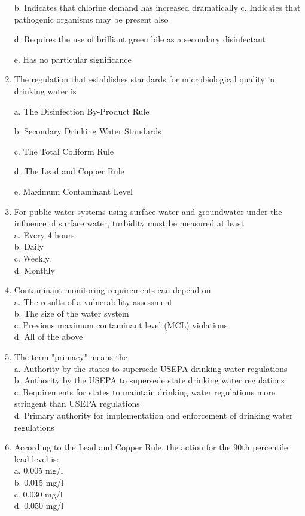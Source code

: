 \begin{enumerate}
b. Indicates that chlorine demand has increased dramatically 
c. Indicates that pathogenic organisms may be present also

d. Requires the use of brilliant green bile as a secondary disinfectant

e. Has no particular significance

\item The regulation that establishes standards for microbiological quality in drinking water is

a. The Disinfection By-Product Rule

b. Secondary Drinking Water Standards

c. The Total Coliform Rule

d. The Lead and Copper Rule

e. Maximum Contaminant Level

\item For public water systems using surface water and groundwater under the influence of surface water, turbidity must be measured at least\\
a. Every 4 hours\\
b. Daily\\
c. Weekly.\\
d. Monthly\\

\item Contaminant monitoring requirements can depend on\\
a. The results of a vulnerability assessment\\
b. The size of the water system\\
c. Previous maximum contaminant level (MCL) violations\\
d. All of the above\\

\item The term "primacy" means the\\
a. Authority by the states to supersede USEPA drinking water regulations\\
b. Authority by the USEPA to supersede state drinking water regulations\\
c. Requirements for states to maintain drinking water regulations more stringent than USEPA regulations \\
d. Primary authority for implementation and enforcement of drinking water regulations\\

\item According to the Lead and Copper Rule. the action for the 90th percentile lead level is:\\
a. 0.005 mg/l\\
b. 0.015 mg/l\\
c. 0.030 mg/l\\
d. 0.050 mg/l\\




\end{enumerate}
